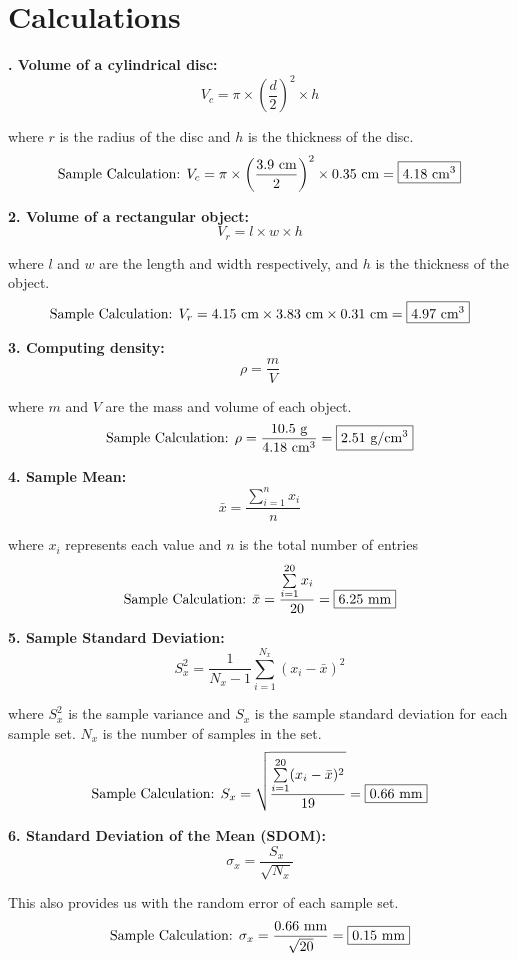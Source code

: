 \documentclass[12pt]{article}
\begin{document}
\section{Calculations}
\textbf{\!\!\!\!\!\!\!\!\!. Volume of a cylindrical disc:}\[V_c=\pi\times\left(\frac{d}{2}\right)^2\times h\]
\begin{center}
    where \(r\) is the radius of the disc and \(h\) is the thickness of the disc.
    \[\textnormal{Sample Calculation: }V_c=\pi\times\left(\frac{3.9\textnormal{ cm}}{2}\right)^2\times0.35 \textnormal{ cm}=\boxed{4.18 \textnormal{ cm}^3}\]
\end{center}
\textbf{2. Volume of a rectangular object:}\[V_r=l\times w\times h\]
\begin{center}
    where \(l\) and \(w\) are the length and width respectively, and \(h\) is the thickness of the object.
    \[\textnormal{Sample Calculation: }V_r=4.15\textnormal{ cm}\times3.83\textnormal{ cm}\times0.31\textnormal{ cm}=\boxed{4.97 \textnormal{ cm}^3}\]
\end{center}
\textbf{3. Computing density:\[\rho=\frac{m}{V}\]}
\begin{center}
    where \(m\) and \(V\) are the mass and volume of each object.
    \[\textnormal{Sample Calculation: }\rho = \frac{10.5\textnormal{ g}}{4.18 \textnormal{ cm}^3}=\boxed{2.51\textnormal{ g}/\textnormal{cm}^3}\]
\end{center}
\textbf{4. Sample Mean:}\[\bar{x}=\frac{\sum\limits^{n}_{i=1}{x_i}}{n}\]
\begin{center}
    where \(x_i\) represents each value and \(n\) is the total number of entries
    \[\textnormal{Sample Calculation: }\bar{x}=\frac{\sum\limits^{20}_{i=1}x_i}{20}=\boxed{6.25 \textnormal{ mm}}\]
\end{center}
\textbf{5. Sample Standard Deviation:}\[S_x^2=\frac{1}{N_x-1}\sum^{N_x}_{i=1}(x_i-\bar{x})^2 \]
\begin{center}
    where \(S_x^2\) is the sample variance and \(S_x\) is the sample standard deviation for each sample set. \(N_x\) is the number of samples in the set. \\
    \[\textnormal{Sample Calculation: }S_x=\sqrt{\frac{\sum\limits^{20}_{i=1}(x_i-\bar{x})^2}{19}}=\boxed{0.66\textnormal{ mm}}\]
\end{center}
\textbf{6. Standard Deviation of the Mean (SDOM):}\[\sigma_x=\frac{S_x}{\sqrt{N_x}}\]
\begin{center}
    This also provides us with the random error of each sample set.\\
    \[\textnormal{Sample Calculation: }\sigma_x=\frac{0.66\textnormal{ mm}}{\sqrt{20}}=\boxed{0.15 \textnormal{ mm}}\]
\end{center}
\end{document}
